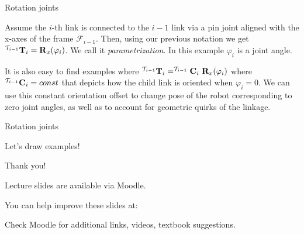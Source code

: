 \documentclass{beamer}
\begin{document}
\begin{frame}{Rotation joints}
	\begin{flushleft}
		
		Assume the $i$-th link is connected to the $i-1$ link via a pin joint aligned with the x-axes of the frame $\mathcal F_{i-1}$. Then, using our previous notation we get $ ^{\mathcal T_{i-1}}\mathbf{T}_i = \mathbf{R}_x (\varphi_i)$. We call it \emph{parametrization}. In this example $\varphi_i$ is a joint angle.
		
		\bigskip
		
		It is also easy to find examples where  $ ^{\mathcal T_{i-1}}\mathbf{T}_i = ^{\mathcal T_{i-1}}\mathbf{C}_i \ \mathbf{R}_x (\varphi_i)$ where $^{\mathcal T_{i-1}}\mathbf{C}_i = const$ that depicts how the child link is oriented when $\varphi_i = 0$. We can use this constant orientation offset to change pose of the robot corresponding to zero joint angles, as well as to account for geometric quirks of the linkage.
		
	\end{flushleft}
\end{frame}



\begin{frame}{Rotation joints}
	\begin{flushleft}
		
		Let's draw examples!
		
	\end{flushleft}
\end{frame}




\begin{frame}{Thank you!}
\centerline{Lecture slides are available via Moodle.}
\bigskip
\centerline{You can help improve these slides at:}
\centerline{\mygit}
\bigskip
\centerline{Check Moodle for additional links, videos, textbook suggestions.}
\bigskip

\centerline{\textcolor{black}{}}

\end{frame}
\end{document}

